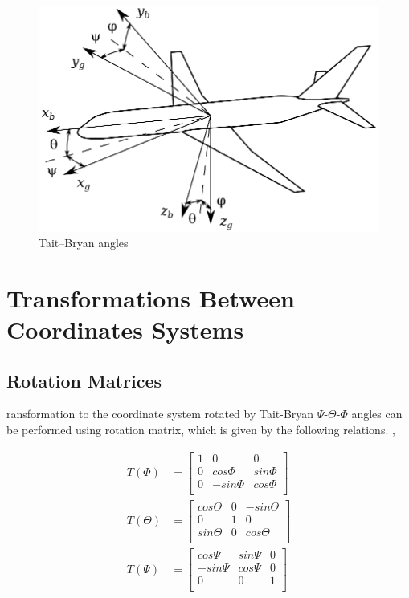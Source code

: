 \begin{figure}
  \centering
  \includegraphics[width=320pt]{images/roll_pitch_yaw.eps}
  \caption{Tait–Bryan angles}
\end{figure}

\section{Transformations Between Coordinates Systems}

\subsection{Rotation Matrices}

ransformation to the coordinate system rotated by Tait-Bryan $\Psi$-$\Theta$-$\Phi$ angles can be performed using rotation matrix, which is given by the following relations. \cite{Padfield2007}, \cite{Sibilski2004}

\begin{align}
  T \left( \Phi \right) &=
  \left[
    \begin{matrix}
      1 &        0 &       0 \\
      0 &  cos\Phi & sin\Phi \\
      0 & -sin\Phi & cos\Phi \\
    \end{matrix}
  \right]
  \\
  T \left( \Theta \right) &=
  \left[
    \begin{matrix}
      cos\Theta & 0 & -sin\Theta \\
              0 & 1 &          0 \\
      sin\Theta & 0 &  cos\Theta \\
    \end{matrix}
  \right]
  \\
  T \left( \Psi \right) &=
  \left[
    \begin{matrix}
       cos\Psi & sin\Psi & 0 \\
      -sin\Psi & cos\Psi & 0 \\
             0 &       0 & 1 \\
    \end{matrix}
  \right]
\end{align}

